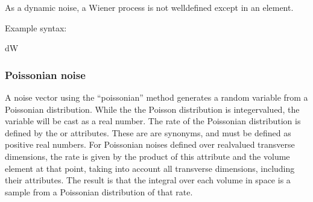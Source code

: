 \documentclass[letterpaper,10pt,english]{sphinxmanual}
\begin{document}
\sphinxAtStartPar
As a dynamic noise, a Wiener process is not well\sphinxhyphen{}defined except in an  element.

\sphinxAtStartPar
Example syntax:

\begin{sphinxVerbatim}[commandchars=\\\{\}]
 
          
      dW
\end{sphinxVerbatim}

\ignorespaces 

\subsubsection{Poissonian noise}
\label{\detokenize{reference_elements:poissonian-noise}}\label{\detokenize{reference_elements:poissioniannoise}}\label{\detokenize{reference_elements:index-62}}
\sphinxAtStartPar
A noise vector using the “poissonian” method generates a random variable from a Poissonian distribution.  While the the Poisson distribution is integer\sphinxhyphen{}valued, the variable will be cast as a real number.  The rate of the Poissonian distribution is defined by the  or  attributes.  These are are synonyms, and must be defined as positive real numbers.  For Poissonian noises defined over real\sphinxhyphen{}valued transverse dimensions, the rate is given by the product of this  attribute and the volume element at that point, taking into account all transverse dimensions, including their  attributes.  The result is that the integral over each volume in space is a sample from a Poissonian distribution of that rate.
\end{document}
